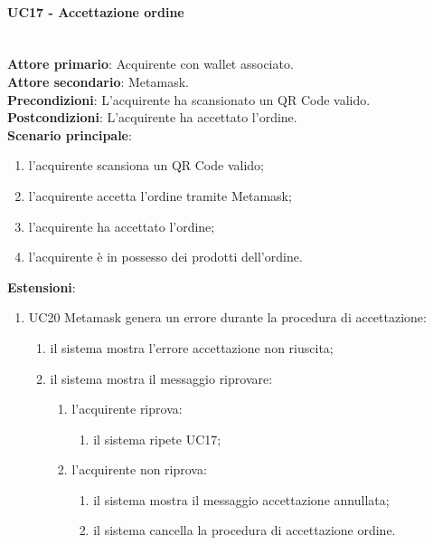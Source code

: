 \documentclass[a4paper, 12pt]{article}
\begin{document}
\paragraph{UC17 - Accettazione ordine}\\
\textbf{Attore primario}: Acquirente con wallet associato.\\
\textbf{Attore secondario}: Metamask.\\
\textbf{Precondizioni}: L'acquirente ha scansionato un QR Code valido.\\
\textbf{Postcondizioni}: L'acquirente ha accettato l'ordine.\\
\textbf{Scenario principale}:
\begin{enumerate}
    \item l'acquirente scansiona un QR Code valido;
    \item l'acquirente accetta l'ordine tramite Metamask;
    \item l'acquirente ha accettato l'ordine;
    \item l'acquirente è in possesso dei prodotti dell'ordine.
\end{enumerate}
\textbf{Estensioni}:
\begin{enumerate}
    \item UC20 Metamask genera un errore durante la procedura di accettazione:
    \begin{enumerate}
        \item il sistema mostra l'errore accettazione non riuscita;
        \item il sistema mostra il messaggio riprovare:
        \begin{enumerate}
            \item l'acquirente riprova:
            \begin{enumerate}
                \item il sistema ripete UC17;
            \end{enumerate}
            \item l'acquirente non riprova:
            \begin{enumerate}
                \item il sistema mostra il messaggio accettazione annullata;
                \item il sistema cancella la procedura di accettazione ordine.
            \end{enumerate}
        \end{enumerate}
    \end{enumerate}
\end{enumerate}
\end{document}
